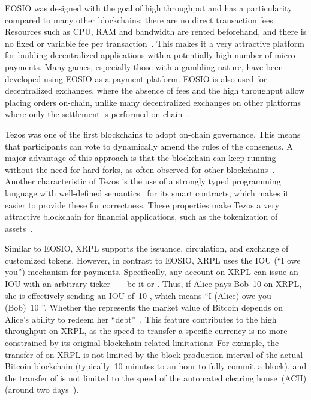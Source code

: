  EOSIO was designed with the goal of high throughput and has a particularity compared to many other blockchains: there are no direct transaction fees.
Resources such as CPU, RAM and bandwidth are rented beforehand, and there is no fixed or variable fee per transaction~\cite{EOS}.
This makes it a very attractive platform for building decentralized applications with a potentially high number of micro-payments.
Many games, especially those with a gambling nature, have been developed using EOSIO as a payment platform.
EOSIO is also used for decentralized exchanges, where the absence of fees and the high throughput allow placing orders on-chain, unlike many decentralized exchanges on other platforms where only the settlement is performed on-chain~\cite{warren20170x}.

Tezos was one of the first blockchains to adopt on-chain governance.
This means that participants can vote to dynamically amend the rules of the consensus.
A major advantage of this approach is that the blockchain can keep running without the need for hard forks, as often observed for other blockchains~\cite{byzantium-fork, dao-fork}.
Another characteristic of Tezos is the use of a strongly typed programming language with well-defined semantics~\cite{NomadicLabs2018} for its smart contracts, which makes it easier to provide these for correctness.
These properties make Tezos a very attractive blockchain for financial applications, such as the tokenization of assets~\cite{BTGPactual2019}.

Similar to EOSIO, XRPL supports the issuance, circulation, and exchange of customized tokens.
However, in contrast to EOSIO, XRPL uses the IOU (``I owe you'') mechanism for payments.
Specifically, any account on XRPL can issue an IOU with an arbitrary ticker~---~be it  or .
Thus, if Alice pays Bob~10  on XRPL, she is effectively sending an IOU of~10 , which means ``I (Alice) owe you (Bob)~10 ''.
Whether the  represents the market value of Bitcoin depends on Alice's ability to redeem her ``debt''~\cite{XRPLedger2020}.
This feature contributes to the high throughput on XRPL, as the speed to transfer a specific currency is no more constrained by its original blockchain-related limitations: For example, the transfer of  on XRPL is not limited by the block production interval of the actual Bitcoin blockchain (typically~10 minutes to an hour to fully commit a block), and the transfer of  is not limited to the speed of the automated clearing house~(ACH) (around two days~\cite{Love2013}).

